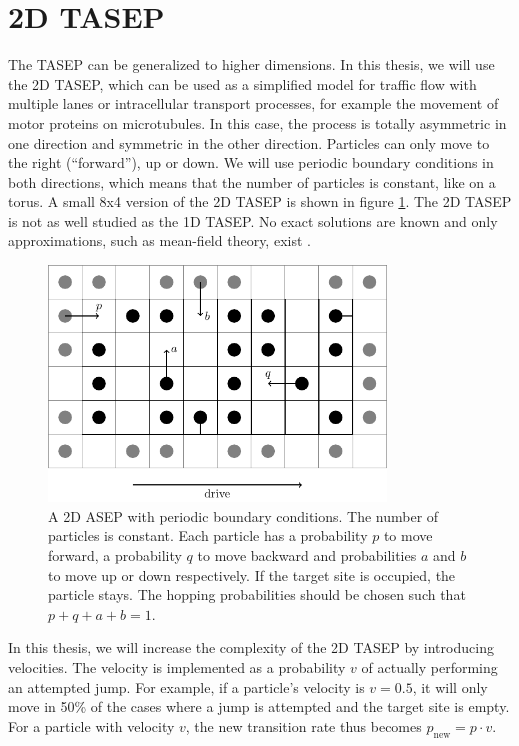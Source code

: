 \section{2D TASEP}
\label{sec:2d-tasep}
The TASEP can be generalized to higher dimensions. In this thesis, we will use the 2D TASEP, which can be used as a simplified model for traffic flow with multiple lanes or intracellular transport processes, for example the movement of motor proteins on microtubules. In this case, the process is totally asymmetric in one direction and symmetric in the other direction. Particles can only move to the right (\enquote{forward}), up or down. We will use periodic boundary conditions in both directions, which means that the number of particles is constant, like on a torus. A small 8x4 version of the 2D TASEP is shown in figure \ref{fig:tasep_2d}. The 2D TASEP is not as well studied as the 1D TASEP. No exact solutions are known and only approximations, such as mean-field theory, exist \cite{goykolov_asymmetric_2007}.
\\
\begin{figure}[h]
    \centering
    \includegraphics[width=0.8\textwidth]{tasep_2d.pdf}
    \caption{A 2D ASEP with periodic boundary conditions. The number of particles is constant. Each particle has a probability $p$ to move forward, a probability $q$ to move backward and probabilities $a$ and $b$ to move up or down respectively. If the target site is occupied, the particle stays. The hopping probabilities should be chosen such that $p+q+a+b=1$.}
    \label{fig:tasep_2d}
\end{figure}
In this thesis, we will increase the complexity of the 2D TASEP by introducing velocities. The velocity is implemented as a probability $v$ of actually performing an attempted jump. For example, if a particle's velocity is $v=0.5$, it will only move in 50\% of the cases where a jump is attempted and the target site is empty. For a particle with velocity $v$, the new transition rate thus becomes $p_{\text{new}} = p \cdot v$. 


